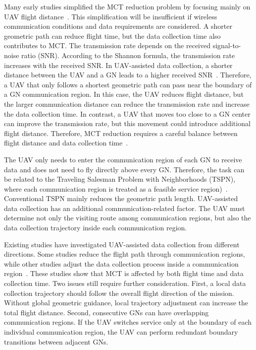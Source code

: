 \documentclass[12pt]{ksthesis}
\begin{document}
\begin{thesis}
{    Many early studies simplified the MCT reduction problem by focusing mainly on UAV flight distance~\cite{Alemayehu2017TSPHeuristic}. This simplification will be insufficient if wireless communication conditions and data requirements are considered. A shorter geometric path can reduce flight time, but the data collection time also contributes to MCT. The transmission rate depends on the received signal-to-noise ratio (SNR). According to the Shannon formula, the transmission rate increases with the received SNR. In UAV-assisted data collection, a shorter distance between the UAV and a GN leads to a higher received SNR~\cite{Wang2022TrajectoryPower}. Therefore, a UAV that only follows a shortest geometric path can pass near the boundary of a GN communication region. In this case, the UAV reduces flight distance, but the larger communication distance can reduce the transmission rate and increase the data collection time. In contrast, a UAV that moves too close to a GN center can improve the transmission rate, but this movement could introduce additional flight distance. Therefore, MCT reduction requires a careful balance between flight distance and data collection time~\cite{Gong2018FlightTimeMinimization, Fu2024CollectionPoint}.

    The UAV only needs to enter the communication region of each GN to receive data and does not need to fly directly above every GN. Therefore, the task can be related to the Traveling Salesman Problem with Neighborhoods (TSPN), where each communication region is treated as a feasible service region)~\cite{Luo2021TrajectoryWSN}. Conventional TSPN mainly reduces the geometric path length. UAV-assisted data collection has an additional communication-related factor. The UAV must determine not only the visiting route among communication regions, but also the data collection trajectory inside each communication region.

    Existing studies have investigated UAV-assisted data collection from different directions. Some studies reduce the flight path through communication regions, while other studies adjust the data collection process inside a communication region~\cite{Luo2021TrajectoryWSN, Wang2020CollaborativeUAVs, He2024VShapedTrajectory}. These studies show that MCT is affected by both flight time and data collection time. Two issues still require further consideration. First, a local data collection trajectory should follow the overall flight direction of the mission. Without global geometric guidance, local trajectory adjustment can increase the total flight distance. Second, consecutive GNs can have overlapping communication regions. If the UAV switches service only at the boundary of each individual communication region, the UAV can perform redundant boundary transitions between adjacent GNs.

}
\end{thesis}
\end{document}
